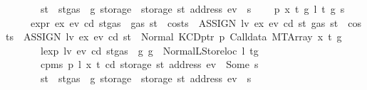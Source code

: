 \begin{isabellebody}
\ \ \ \ \ \ \ {\isachardoublequoteopen}st{\isacharprime}{\kern0pt}\ {\isacharequal}{\kern0pt}\ st{\isasymlparr}gas\ {\isacharcolon}{\kern0pt}{\isacharequal}{\kern0pt}\ g{\isacharprime}{\kern0pt}{\isacharcomma}{\kern0pt}\ storage\ {\isacharcolon}{\kern0pt}{\isacharequal}{\kern0pt}\ {\isacharparenleft}{\kern0pt}storage\ st{\isacharparenright}{\kern0pt}\ {\isacharparenleft}{\kern0pt}address\ ev\ {\isacharcolon}{\kern0pt}{\isacharequal}{\kern0pt}\ s{\isacharparenright}{\kern0pt}{\isasymrparr}{\isachardoublequoteclose}\isanewline
\ \ {\isacharbar}{\kern0pt}\ {\isacharparenleft}{\kern0pt}{}{\isacharparenright}{\kern0pt}\ p\ x\ t\ g\ l\ t{\isacharprime}{\kern0pt}\ g{\isacharprime}{\kern0pt}\ s\isanewline
\ \ \ \ \ {\isachardoublequoteopen}expr\ ex\ ev\ cd\ {\isacharparenleft}{\kern0pt}st{\isasymlparr}gas\ {\isacharcolon}{\kern0pt}{\isacharequal}{\kern0pt}\ gas\ st\ {\isacharminus}{\kern0pt}\ costs\ \ {\isacharparenleft}{\kern0pt}ASSIGN\ lv\ ex{\isacharparenright}{\kern0pt}\ ev\ cd\ st{\isasymrparr}{\isacharparenright}{\kern0pt}\ {\isacharparenleft}{\kern0pt}gas\ st\ {\isacharminus}{\kern0pt}\ costs\ \ {\isacharparenleft}{\kern0pt}ASSIGN\ lv\ ex{\isacharparenright}{\kern0pt}\ ev\ cd\ st{\isacharparenright}{\kern0pt}\ {\isacharequal}{\kern0pt}\ Normal\ {\isacharparenleft}{\kern0pt}{\isacharparenleft}{\kern0pt}KCDptr\ p{\isacharcomma}{\kern0pt}\ Calldata\ {\isacharparenleft}{\kern0pt}MTArray\ x\ t{\isacharparenright}{\kern0pt}{\isacharparenright}{\kern0pt}{\isacharcomma}{\kern0pt}\ g{\isacharparenright}{\kern0pt}{\isachardoublequoteclose}\isanewline
\ \ \ \ \ \ \ {\isachardoublequoteopen}lexp\ lv\ ev\ cd\ {\isacharparenleft}{\kern0pt}st{\isasymlparr}gas\ {\isacharcolon}{\kern0pt}{\isacharequal}{\kern0pt}\ g{\isasymrparr}{\isacharparenright}{\kern0pt}\ g\ {\isacharequal}{\kern0pt}\ Normal{\isacharparenleft}{\kern0pt}{\isacharparenleft}{\kern0pt}LStoreloc\ l{\isacharcomma}{\kern0pt}\ t{\isacharprime}{\kern0pt}{\isacharparenright}{\kern0pt}{\isacharcomma}{\kern0pt}g{\isacharprime}{\kern0pt}{\isacharparenright}{\kern0pt}{\isachardoublequoteclose}\isanewline
\ \ \ \ \ \ \ {\isachardoublequoteopen}cpm{}s\ p\ l\ x\ t\ cd\ {\isacharparenleft}{\kern0pt}storage\ st\ {\isacharparenleft}{\kern0pt}address\ ev{\isacharparenright}{\kern0pt}{\isacharparenright}{\kern0pt}\ {\isacharequal}{\kern0pt}\ Some\ s{\isachardoublequoteclose}\isanewline
\ \ \ \ \ \ \ {\isachardoublequoteopen}st{\isacharprime}{\kern0pt}\ {\isacharequal}{\kern0pt}\ st{\isasymlparr}gas\ {\isacharcolon}{\kern0pt}{\isacharequal}{\kern0pt}\ g{\isacharprime}{\kern0pt}{\isacharcomma}{\kern0pt}\ storage\ {\isacharcolon}{\kern0pt}{\isacharequal}{\kern0pt}\ {\isacharparenleft}{\kern0pt}storage\ st{\isacharparenright}{\kern0pt}\ {\isacharparenleft}{\kern0pt}address\ ev\ {\isacharcolon}{\kern0pt}{\isacharequal}{\kern0pt}\ s{\isacharparenright}{\kern0pt}{\isasymrparr}{\isachardoublequoteclose}\isanewline

\end{isabellebody}
